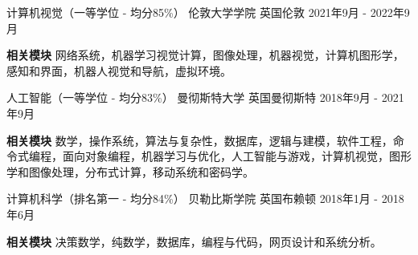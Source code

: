 
\begin{cventries}

\eduentry
{计算机视觉（一等学位 - 均分85\%）} %
{伦敦大学学院} %
{英国伦敦} %
{2021年9月 - 2022年9月} %
{
\begin{cvitems} %
\item {\textbf{相关模块} 网络系统，机器学习视觉计算，图像处理，机器视觉，计算机图形学，感知和界面，机器人视觉和导航，虚拟环境。}
\end{cvitems}
}

\eduentry
{人工智能（一等学位 - 均分83\%）} %
{曼彻斯特大学} %
{英国曼彻斯特} %
{2018年9月 - 2021年9月} %
{
\begin{cvitems} %
\item {\textbf{相关模块} 数学，操作系统，算法与复杂性，数据库，逻辑与建模，软件工程，命令式编程，面向对象编程，机器学习与优化，人工智能与游戏，计算机视觉，图形学和图像处理，分布式计算，移动系统和密码学。}
\end{cvitems}
}

\eduentry
{计算机科学（排名第一 - 均分84\%）} %
{贝勒比斯学院} %
{英国布赖顿} %
{2018年1月 - 2018年6月} %
{
\begin{cvitems} %
\item {\textbf{相关模块} 决策数学，纯数学，数据库，编程与代码，网页设计和系统分析。}
\end{cvitems}
}
\end{cventries}